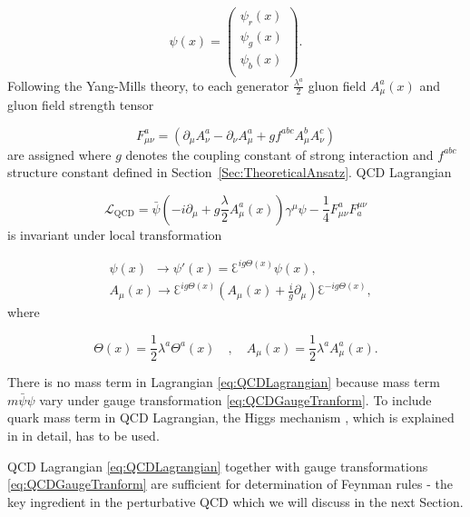\begin{equation}
  \psi(x) = \begin{pmatrix}  
    \psi_r(x) \\ \psi_g(x) \\ \psi_b(x) \\ 
            \end{pmatrix}.
  \label{eq:QuarkWaveFunction}
\end{equation}
Following the Yang-Mills theory, to each generator
$\frac{\lambda^a}{2}$ gluon field $A_\mu^a(x)$ and gluon field strength tensor

\begin{equation}
  F_{\mu\nu}^a = \left( \partial_\mu A_\nu^a - \partial_\nu A_\mu^a + g f^{abc}
  A_\mu^b A_\nu^c \right)
  \label{eq:GluonFieldStrengthTensor}
\end{equation}
are assigned where $g$ denotes the coupling constant of strong interaction and
$f^{abc}$ structure constant defined in Section~\ref{Sec:TheoreticalAnsatz}.
QCD Lagrangian

\begin{equation}
  \mathscr{L}_{\text{QCD}} = \bar{\psi} \left( -i \partial_\mu + g \frac{\lambda}{2}
  A_\mu^a(x) \right) \gamma^\mu \psi - \frac{1}{4}F_{\mu\nu}^aF_a^{\mu\nu}
  \label{eq:QCDLagrangian}
\end{equation}
is invariant under local transformation

\begin{align}
  &\psi(x) \, \, \, \rightarrow \psi'(x) = \Euler^{ig\Theta(x)} \psi(x),
    \label{eq:QCDGaugeTranform} \\
  &A_\mu(x) \rightarrow \Euler^{ig\Theta(x)} \left( A_\mu(x) +
    \frac{i}{g}\partial_\mu \right) \Euler^{-ig\Theta(x)}, 
  \nonumber
\end{align}
where

\begin{equation}
  \Theta(x) = \frac{1}{2} \lambda^a \Theta^a(x) 
  \quad , \quad
  A_\mu(x) = \frac{1}{2} \lambda^a A_\mu^a(x).
  \label{eq:QCDAdditionalFunctions}
\end{equation}

There is no mass term in Lagrangian \eqref{eq:QCDLagrangian} because mass term
$m\bar{\psi}\psi$ vary under gauge transformation
\eqref{eq:QCDGaugeTranform}. To include quark mass term in QCD Lagrangian, the
Higgs mechanism \cite{HiggsMechanism}, which is explained in
\cite{horejsi2002fundamentals} in detail, has to be used.

QCD Lagrangian \eqref{eq:QCDLagrangian} together with gauge transformations
\eqref{eq:QCDGaugeTranform} are sufficient for determination of Feynman rules -
the key ingredient in the perturbative QCD which we will discuss in the next
Section.

